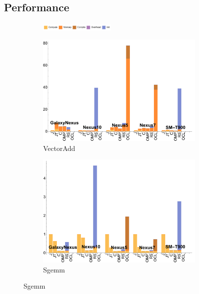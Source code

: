 \subsection{Performance}



\begin{figure}[t]

  \begin{subfigure}[b]{\textwidth}
          \centering
          \includegraphics[width=0.4\textwidth]{data/legend.pdf}
  \end{subfigure}

  \begin{subfigure}[b]{0.5\textwidth}
      \centering
      \includegraphics[width=0.9\textwidth]{data/VectorAdd_onecompute_time.pdf}
      \caption{VectorAdd}\label{fig:vectoradd}
  \end{subfigure}
  \begin{subfigure}[b]{0.5\textwidth}
      \centering
      \includegraphics[width=0.9\textwidth]{data/Sgemm_onecompute_time.pdf}
      \caption{Sgemm}\label{fig:Sgemm}
  \end{subfigure}


\end{figure}

